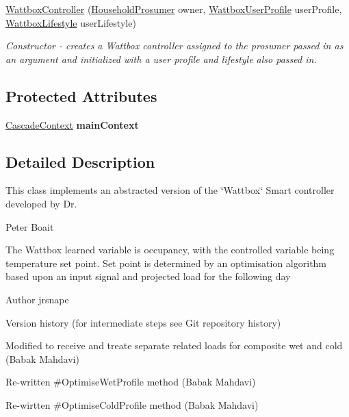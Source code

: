 \begin{DoxyCompactItemize}
\item 
\hyperlink{classuk_1_1ac_1_1dmu_1_1iesd_1_1cascade_1_1controllers_1_1_wattbox_controller_ad1adb0d7a97bf340ee5bbfcfffacd94b}{Wattbox\-Controller} (\hyperlink{classuk_1_1ac_1_1dmu_1_1iesd_1_1cascade_1_1agents_1_1prosumers_1_1_household_prosumer}{Household\-Prosumer} owner, \hyperlink{enumuk_1_1ac_1_1dmu_1_1iesd_1_1cascade_1_1controllers_1_1_wattbox_user_profile}{Wattbox\-User\-Profile} user\-Profile, \hyperlink{enumuk_1_1ac_1_1dmu_1_1iesd_1_1cascade_1_1controllers_1_1_wattbox_lifestyle}{Wattbox\-Lifestyle} user\-Lifestyle)
\begin{DoxyCompactList}\small\item\em Constructor -\/ creates a Wattbox controller assigned to the prosumer passed in as an argument and initialized with a user profile and lifestyle also passed in. \end{DoxyCompactList}\end{DoxyCompactItemize}
\subsection*{Protected Attributes}
\begin{DoxyCompactItemize}
\item 
\hypertarget{classuk_1_1ac_1_1dmu_1_1iesd_1_1cascade_1_1controllers_1_1_wattbox_controller_a17d6462f8a51c8aa5157cbe23ffd044a}{\hyperlink{classuk_1_1ac_1_1dmu_1_1iesd_1_1cascade_1_1context_1_1_cascade_context}{Cascade\-Context} {\bfseries main\-Context}}\label{classuk_1_1ac_1_1dmu_1_1iesd_1_1cascade_1_1controllers_1_1_wattbox_controller_a17d6462f8a51c8aa5157cbe23ffd044a}

\end{DoxyCompactItemize}


\subsection{Detailed Description}
This class implements an abstracted version of the \char`\"{}\-Wattbox\char`\"{} Smart controller developed by Dr. 

Peter Boait

The Wattbox learned variable is occupancy, with the controlled variable being temperature set point. Set point is determined by an optimisation algorithm based upon an input signal and projected load for the following day

\begin{DoxyAuthor}{Author}
jrsnape
\end{DoxyAuthor}
Version history (for intermediate steps see Git repository history)
\begin{DoxyItemize}
\item Modified to receive and treate separate related loads for composite wet and cold (Babak Mahdavi)
\item Re-\/written \#\-Optimise\-Wet\-Profile method (Babak Mahdavi)
\item Re-\/wirtten \#\-Optimise\-Cold\-Profile method (Babak Mahdavi) 
\end{DoxyItemize}

